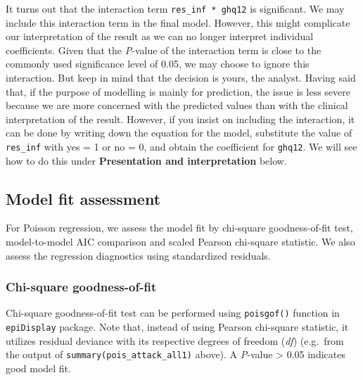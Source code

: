 \documentclass[
  10pt,
]{krantz}
\begin{document}
It turns out that the interaction term \texttt{res\_inf\ *\ ghq12} is significant. We may include this interaction term in the final model. However, this might complicate our interpretation of the result as we can no longer interpret individual coefficients. Given that the \emph{P}-value of the interaction term is close to the commonly used significance level of 0.05, we may choose to ignore this interaction. But keep in mind that the decision is yours, the analyst. Having said that, if the purpose of modelling is mainly for prediction, the issue is less severe because we are more concerned with the predicted values than with the clinical interpretation of the result. However, if you insist on including the interaction, it can be done by writing down the equation for the model, substitute the value of \texttt{res\_inf} with yes = 1 or no = 0, and obtain the coefficient for \texttt{ghq12}. We will see how to do this under \textbf{Presentation and interpretation} below.

\hypertarget{model-fit-assessment-2}{%
\subsection{\texorpdfstring{Model fit assessment}{Model fit assessment}}\label{model-fit-assessment-2}}

For Poisson regression, we assess the model fit by chi-square goodness-of-fit test, model-to-model AIC comparison and scaled Pearson chi-square statistic. We also assess the regression diagnostics using standardized residuals.

\hypertarget{chi-square-goodness-of-fit}{%
\subsubsection*{Chi-square goodness-of-fit}\label{chi-square-goodness-of-fit}}


Chi-square goodness-of-fit test can be performed using \texttt{poisgof()} function in \texttt{epiDisplay} package. Note that, instead of using Pearson chi-square statistic, it utilizes residual deviance with its respective degrees of freedom (\emph{df}) (e.g.~from the output of \texttt{summary(pois\_attack\_all1)} above). A \emph{P}-value \textgreater{} 0.05 indicates good model fit.
\end{document}
